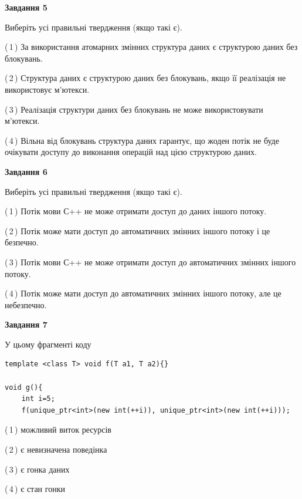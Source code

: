\documentclass[12pt, ukrainian]{article}
\begin{document}
\begin {large}
{\begin{center}
\textbf{Завдання 5}
\end{center}

Виберіть усі правильні твердження (якщо такі є).\par
\vspace{2mm}

(\,1\,) За використання атомарних змінних структура даних є структурою даних без блокувань.%

(\,2\,) Структура даних є структурою даних без блокувань, якщо її реалізація не використовує м’ютекси.%

(\,3\,) Реалізація структури даних без блокувань не може використовувати м’ютекси.%

(\,4\,) Вільна від блокувань структура даних гарантує, що жоден потік не буде очікувати доступу до виконання операцій над цією структурою даних.%
\newpage


\begin{center}
\textbf{Завдання 6}
\end{center}

Виберіть усі правильні твердження (якщо такі є).\par
\vspace{2mm}

(\,1\,) Потік мови С++ не може отримати доступ до даних іншого потоку.%

(\,2\,) Потік може мати доступ до автоматичних змінних іншого потоку і це безпечно.%

(\,3\,) Потік мови С++ не може отримати доступ до автоматичних змінних іншого потоку.%

(\,4\,) Потік може мати доступ до автоматичних змінних іншого потоку, але це небезпечно.%


\begin{center}
\textbf{Завдання 7}
\end{center}

У цьому фрагменті коду
\begin{verbatim}
template <class T> void f(T a1, T a2){}

void g(){
    int i=5;
    f(unique_ptr<int>(new int(++i)), unique_ptr<int>(new int(++i)));
\end{verbatim}

(\,1\,) можливий виток ресурсів%

(\,2\,) є невизначена поведінка%

(\,3\,) є гонка даних%

(\,4\,) є стан гонки%

}
\end {large}

\vspace{4mm}
\newpage
\end{document}
